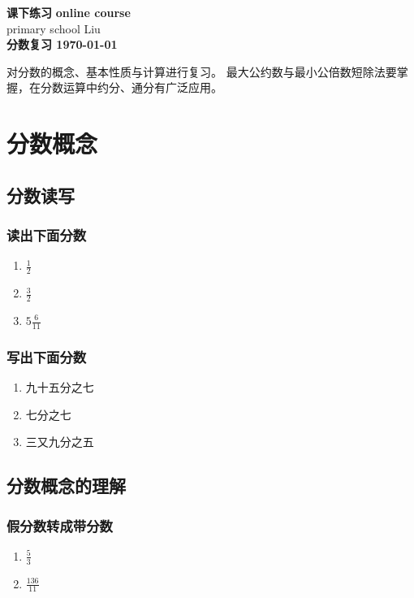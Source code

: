 \documentclass[DIN, pagenumber=false, fontsize=11pt, parskip=half]{scrartcl}
\newcommand{\mytitle}[1]{{\noindent\Large\textbf{#1}}}
\begin{document}
\noindent\textbf{课下练习} \hfill \textbf{online course}\\
primary school \hfill Liu\\

\mytitle{分数复习 \hfill \today}
\newline
\begin{parchmentquote}
    对分数的概念、基本性质与计算进行复习。\newline
    最大公约数与最小公倍数短除法要掌握，在分数运算中约分、通分有广泛应用。
\end{parchmentquote}


\section{分数概念}

\subsection{分数读写}
\subsubsection{读出下面分数}

\begin{enumerate}
    \item $\frac{1}{2}$
    \item $\frac{3}{2}$
    \item $5\frac{6}{11}$
\end{enumerate}
\subsubsection{写出下面分数}

\begin{enumerate}
    \item 九十五分之七
    \item 七分之七
    \item 三又九分之五
\end{enumerate}
\subsection{分数概念的理解}
\subsubsection{假分数转成带分数}
\begin{enumerate}
    \item $\frac{5}{3}$
    \item $\frac{136}{11}$
\end{enumerate}
\end{document}
